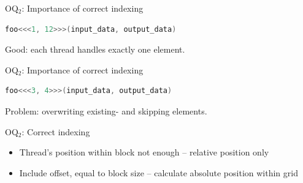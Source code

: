 \documentclass[11pt,t]{beamer}
\begin{document}
\begin{frame}[fragile]{OQ$_\text{2}$: Importance of correct indexing} 

\begin{lstlisting}[language=C++]
foo<<<1, 12>>>(input_data, output_data)
\end{lstlisting}

\vspace{-0 em}

\begin{figure}[t]
    \centering
    \begin{center}               
        \resizebox{0.8\columnwidth}{!}{}
    \end{center}
\end{figure}

Good: each thread handles exactly one element.

\end{frame}



\begin{frame}[fragile]{OQ$_\text{2}$: Importance of correct indexing} 

\begin{lstlisting}[language=C++]
foo<<<3, 4>>>(input_data, output_data)
\end{lstlisting}

\vspace{-1 em}

\begin{figure}[t]
    \centering
    \begin{center}               
        \resizebox{0.8\columnwidth}{!}{}
    \end{center}
\end{figure}

Problem: overwriting existing- and skipping elements.

\end{frame}



\begin{frame}[fragile]{OQ$_\text{2}$: Correct indexing} 

\begin{small}
\begin{itemize}
    \item Thread's position within block not enough -- relative position only
    \item Include offset, equal to block size -- calculate absolute position within grid
\end{itemize}
\end{small}

\begin{figure}[t]
    \centering
    \begin{center}               
        \resizebox{0.8\columnwidth}{!}{}
    \end{center}
\end{figure}

\end{frame}
\end{document}
